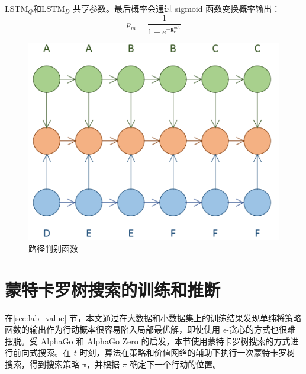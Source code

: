 LSTM$_Q$和LSTM$_D$ 共享参数。最后概率会通过 sigmoid 函数变换概率输出：
\begin{equation}
\label{eq:classification_model}
p_m = \frac{1}{1+e^{-{\mathbf{g}_c^{\text{out}}}}}
\end{equation}

\begin{figure}[!htbp]
\vspace{1em}
\centering
  \includegraphics[width=0.4\linewidth]{figures/MCTS_path}
  \caption{路径判别函数}
  \label{fig:MCTS_path}       %
\vspace{1em}
\end{figure}

\section{蒙特卡罗树搜索的训练和推断}
\label{sec:MCTS_train}
在\ref{sec:lab_value} 节，本文通过在大数据和小数据集上的训练结果发现单纯将策略函数的输出作为行动概率很容易陷入局部最优解，即使使用 $\epsilon$-贪心的方式也很难摆脱。受 AlphaGo 和 AlphaGo Zero 的启发，本节使用蒙特卡罗树搜索的方式进行前向式搜索。在 $t$ 时刻，算法在策略和价值网络的辅助下执行一次蒙特卡罗树搜索，得到搜索策略 $\mathbb{\pi}$，并根据 $\pi$ 确定下一个行动的位置。

